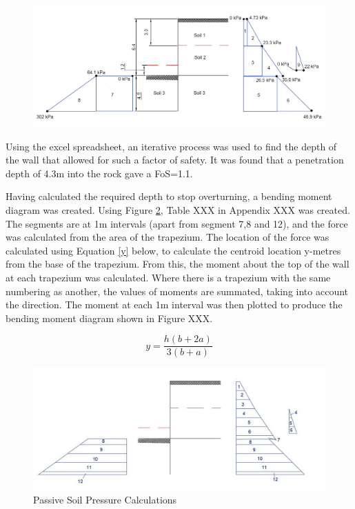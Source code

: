\documentclass[12pt, a4paper]{article}
\begin{document}
\begin{figure}[H]
  \centering
  	\includegraphics[width=0.7\textheight]{initialwallcalcsmodel}
   	\caption{}
	\label{pressdiag}
\end{figure}
\begin{justify}
Using the excel spreadsheet, an iterative process was used to find the depth of the wall that allowed for such a factor of safety. It was found that a penetration depth of 4.3m into the rock gave a FoS=1.1.
\end{justify}
\begin{justify}
Having calculated the required depth to stop overturning, a bending moment diagram was created. Using Figure \ref{bendmomfig}, Table XXX in Appendix XXX was created. The segments are at 1m intervals (apart from segment 7,8 and 12), and the force was calculated from the area of the trapezium. The location of the force was calculated using Equation \ref{y} below, to calculate the centroid location y-metres from the base of the trapezium. From this, the moment about the top of the wall at each trapezium was calculated. Where there is a trapezium with the same numbering as another, the values of moments are summated, taking into account the direction. The moment at each 1m interval was then plotted to produce the bending moment diagram shown in Figure XXX.
\end{justify}

\begin{equation}
    y=\frac{h(b+2a)}{3(b+a)}
    \label{y}
\end{equation}

\begin{figure}[H]
\centering
  	\includegraphics[width=0.75\textheight]{bendingmomentcalcsfig}
   	\caption{Passive Soil Pressure Calculations}
	\label{bendmomfig}
\end{figure}
\end{document}
